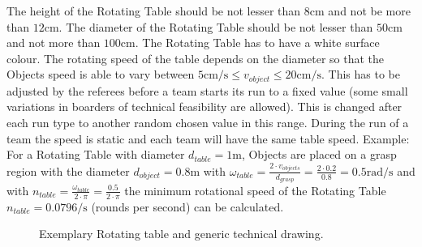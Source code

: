 The height of the Rotating Table should be not lesser than $8\si{\centi\meter}$ and not be more than $12\si{\centi\meter}$. The diameter of the Rotating Table should be not lesser than $50\si{\centi\meter}$ and not more than $100\si{\centi\meter}$. The Rotating Table has to have a white surface colour. The rotating speed of the table depends on the diameter so that the Objects speed is able to vary between $5 \si{\centi\meter\per\second} \le v_{object} \le 20 \si{\centi\meter\per\second}$. This has to be adjusted by the referees before a team starts its run to a fixed value (some small variations in boarders of  technical feasibility are allowed). This is changed after each run type to another random chosen value in this range. During the run of a team the speed is static and each team will have the same table speed. Example: For a Rotating Table with diameter $d_{table}=1\si{\meter}$, Objects are placed on a grasp region with the diameter $d_{object}=0.8\si{\meter}$ with $\omega_{table} = \frac{2 \cdot v_{objects} }{d_{grasp}}=\frac{2 \cdot 0.2}{0.8}=0.5\si{\radian\per\second}$ and with $n_{table}=\frac{\omega_{table}}{2 \cdot \pi}=\frac{0.5}{2 \cdot \pi}$ the minimum rotational speed of the Rotating Table $n_{table}= 0.0796 \si{\per\second}$ (rounds per second) can be calculated.  

\begin{figure}[h!]
	\centering
	\hspace{0.05\textwidth}
	\caption{Exemplary Rotating table and generic technical drawing.}%
	\label{fig:rottable}
\end{figure}



